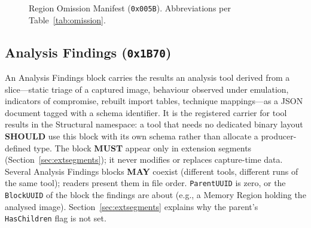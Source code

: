 \documentclass[11pt,a4paper]{article}
\newcommand{\MUST}{\textbf{MUST}}
\newcommand{\SHOULD}{\textbf{SHOULD}}
\newcommand{\MAY}{\textbf{MAY}}
\newcommand{\hex}[1]{\texttt{0x#1}}
\newcommand{\field}[1]{\texttt{#1}}
\begin{document}
\begin{figure}[H]
{}\caption{Region Omission Manifest (\hex{005B}). Abbreviations per Table~\ref{tab:omission}.}\label{fig:omission-payload}\end{figure}

\subsection{Analysis Findings (\hex{1B70})}\label{sec:findings}
An Analysis Findings block carries the results an analysis tool derived from a slice---static triage of a captured image, behaviour observed under emulation, indicators of compromise, rebuilt import tables, technique mappings---as a JSON document tagged with a schema identifier. It is the registered carrier for tool results in the Structural namespace: a tool that needs no dedicated binary layout \SHOULD{} use this block with its own schema rather than allocate a producer-defined type. The block \MUST{} appear only in extension segments (Section~\ref{sec:extsegments}); it never modifies or replaces capture-time data. Several Analysis Findings blocks \MAY{} coexist (different tools, different runs of the same tool); readers present them in file order. \field{ParentUUID} is zero, or the \field{BlockUUID} of the block the findings are about (e.g., a Memory Region holding the analysed image). Section~\ref{sec:extsegments} explains why the parent's \field{HasChildren} flag is not set.
\end{document}
